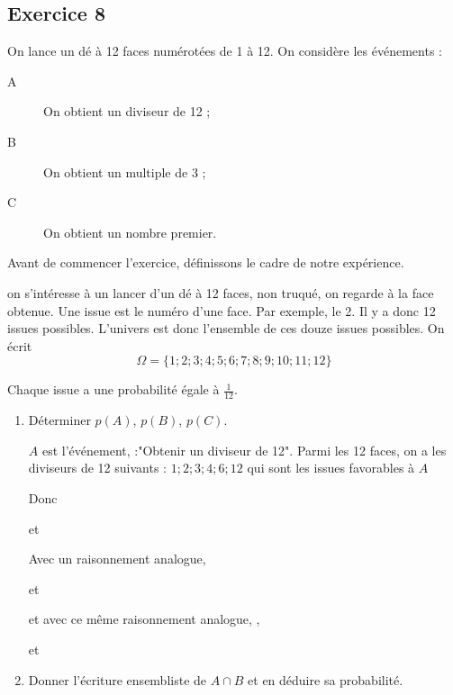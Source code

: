 \documentclass[openany]{book}
\begin{document}
 \begin{minipage}{0.5\linewidth}

\subsection{Exercice 8}
 
On lance un dé à 12 faces numérotées de 1 à 12. On considère les événements :

\begin{description}
\item[A] On obtient un diviseur de 12 ;
\item[B] On obtient un multiple de 3 ;
\item[C] On obtient un nombre premier.
\end{description}

Avant de commencer l'exercice, définissons le cadre de notre expérience.

on s'intéresse à un lancer d'un dé à 12 faces, non truqué, on regarde à la face obtenue.
Une issue est le numéro d'une face. Par exemple, le 2. Il y a donc 12 issues possibles. L'univers est donc l'ensemble de ces douze issues possibles.
On écrit $$ \Omega = \lbrace 1;2;3;4;5;6;7;8;9;10;11;12\rbrace$$


Chaque issue a une probabilité égale à $\frac{1}{12}$.
\begin{enumerate}
\item Déterminer $p(A)$, $p(B)$, $p(C)$. 

$A$ est l'événement, :"Obtenir un diviseur de 12". 
Parmi les 12 faces, on a les diviseurs de 12 suivants : $  1;2;3;4;6;12$  qui sont les issues favorables à $A$

Donc 


  et 


Avec un raisonnement analogue,   

et 

et avec ce même raisonnement analogue, ,   

et 

\item Donner l'écriture ensembliste de $A \cap B$ et en déduire sa probabilité. 


\end{enumerate}
\end{minipage}
\end{document}
